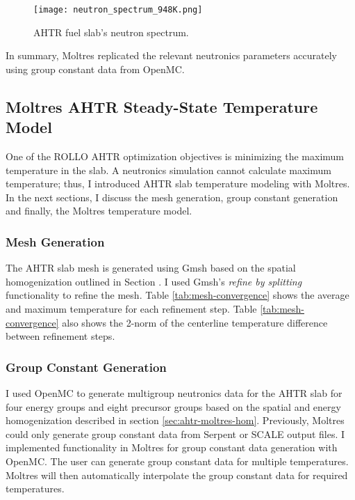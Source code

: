  \begin{figure}[H]
    \centering
    \texttt{[image: neutron\_spectrum\_948K.png]}
    \caption{AHTR fuel slab's neutron spectrum.}  
    \label{fig:neutron_spectrum_948K}
\end{figure}

In summary, Moltres replicated the relevant neutronics parameters accurately 
using group constant data from OpenMC. %

\subsection{Moltres AHTR Steady-State Temperature Model}
\label{sec:ahtr-moltres-model}
One of the ROLLO AHTR optimization objectives is minimizing the maximum 
temperature in the slab. 
A neutronics simulation cannot calculate maximum temperature; thus, I introduced 
AHTR slab temperature modeling with Moltres.
In the next sections, I discuss the mesh generation, group constant generation 
and finally, the Moltres temperature model. 

\subsubsection{Mesh Generation}
The AHTR slab mesh is generated using Gmsh \cite{geuzaine_gmsh_2009} based on 
the spatial homogenization outlined in Section \label{sec:ahtr-moltres-hom}. 
I used Gmsh's \textit{refine by splitting} functionality to refine the mesh. 
Table \ref{tab:mesh-convergence} shows the average and maximum temperature 
for each refinement step. 
Table \ref{tab:mesh-convergence} also shows the 2-norm of the centerline 
temperature difference between refinement steps. 


\subsubsection{Group Constant Generation}
I used OpenMC to generate multigroup neutronics data for the AHTR slab 
for four energy groups and eight precursor groups based on the spatial and 
energy homogenization described in section \ref{sec:ahtr-moltres-hom}.
Previously, Moltres could only generate group constant data from Serpent 
\cite{leppanen_serpent_2014} or SCALE \cite{bucholz_scale:_1982} output files. 
I implemented functionality in Moltres for group constant data generation with 
OpenMC. 
The user can generate group constant data for multiple temperatures. 
Moltres will then automatically interpolate the group constant data for 
required temperatures. 

